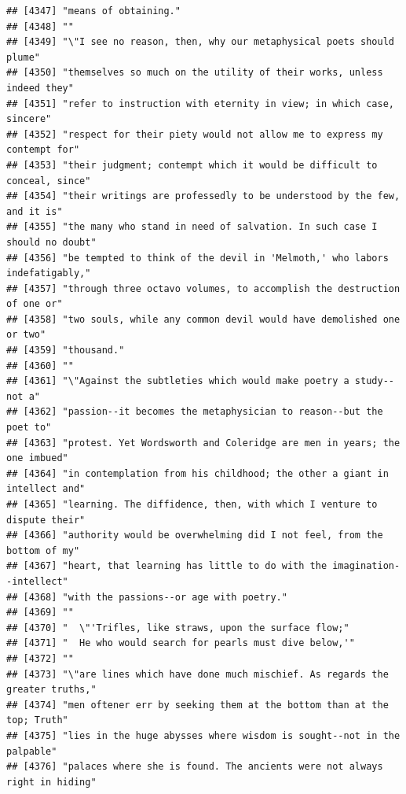 \documentclass{article}\usepackage[]{graphicx}\usepackage[]{color}
\makeatletter
\newenvironment{kframe}{%
 \def\at@end@of@kframe{}%
 \ifinner\ifhmode%
  \def\at@end@of@kframe{\end{minipage}}%
  \begin{minipage}{\columnwidth}%
 \fi\fi%
 \def\FrameCommand##1{\hskip\@totalleftmargin \hskip-\fboxsep
 \colorbox{shadecolor}{##1}\hskip-\fboxsep
     \hskip-\linewidth \hskip-\@totalleftmargin \hskip\columnwidth}%
 \MakeFramed {\advance\hsize-\width
   \@totalleftmargin\z@ \linewidth\hsize
   \@setminipage}}%
 {\par\unskip\endMakeFramed%
 \at@end@of@kframe}
\newenvironment{knitrout}{}{} %
\makeatother
\begin{document}
\begin{knitrout}
\begin{kframe}
\begin{verbatim}
## [4347] "means of obtaining."                                                         
## [4348] ""                                                                            
## [4349] "\"I see no reason, then, why our metaphysical poets should plume"            
## [4350] "themselves so much on the utility of their works, unless indeed they"        
## [4351] "refer to instruction with eternity in view; in which case, sincere"          
## [4352] "respect for their piety would not allow me to express my contempt for"       
## [4353] "their judgment; contempt which it would be difficult to conceal, since"      
## [4354] "their writings are professedly to be understood by the few, and it is"       
## [4355] "the many who stand in need of salvation. In such case I should no doubt"     
## [4356] "be tempted to think of the devil in 'Melmoth,' who labors indefatigably,"    
## [4357] "through three octavo volumes, to accomplish the destruction of one or"       
## [4358] "two souls, while any common devil would have demolished one or two"          
## [4359] "thousand."                                                                   
## [4360] ""                                                                            
## [4361] "\"Against the subtleties which would make poetry a study--not a"             
## [4362] "passion--it becomes the metaphysician to reason--but the poet to"            
## [4363] "protest. Yet Wordsworth and Coleridge are men in years; the one imbued"      
## [4364] "in contemplation from his childhood; the other a giant in intellect and"     
## [4365] "learning. The diffidence, then, with which I venture to dispute their"       
## [4366] "authority would be overwhelming did I not feel, from the bottom of my"       
## [4367] "heart, that learning has little to do with the imagination--intellect"       
## [4368] "with the passions--or age with poetry."                                      
## [4369] ""                                                                            
## [4370] "  \"'Trifles, like straws, upon the surface flow;"                           
## [4371] "  He who would search for pearls must dive below,'"                          
## [4372] ""                                                                            
## [4373] "\"are lines which have done much mischief. As regards the greater truths,"   
## [4374] "men oftener err by seeking them at the bottom than at the top; Truth"        
## [4375] "lies in the huge abysses where wisdom is sought--not in the palpable"        
## [4376] "palaces where she is found. The ancients were not always right in hiding"    

\end{verbatim}
\end{kframe}
\end{knitrout}
\end{document}
